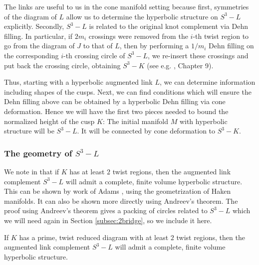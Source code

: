 The links are useful to us in the cone manifold setting because
first, symmetries of the diagram of $L$ allow us to determine the
hyperbolic structure on $S^3-L$ explicitly.  Secondly, $S^3-L$ is
related to the original knot complement via Dehn filling.  In
particular, if $2m_i$ crossings were removed from the $i$-th twist
region to go from the diagram of $J$ to that of $L$, then by
performing a $1/m_i$ Dehn filling on the corresponding $i$-th crossing
circle of $S^3-L$, we re-insert these crossings and put back the
crossing circle, obtaining $S^3-K$ (see e.g.  \cite{rolfsen-book},
Chapter 9).

Thus, starting with a hyperbolic augmented link $L$, we can determine
information including shapes of the cusps.  Next, we can find
conditions which will ensure the Dehn filling above can be obtained by
a hyperbolic Dehn filling via cone deformation.  Hence we will have
the first two pieces needed to bound the normalized height of the cusp
$K$: The initial manifold $M$ with hyperbolic structure will be
$S^3-L$.  It will be connected by cone deformation to $S^3-K$.

\subsubsection{The geometry of $S^3-L$}

We note in \cite{futer-purcell} that if $K$ has at least $2$ twist
regions, then the augmented link complement $S^3-L$ will admit a
complete, finite volume hyperbolic structure.  This can be shown by
work of Adams \cite{adams:aug}, using the geometrization of Haken
manifolds.  It can also be shown more directly using Andreev's
theorem.  The proof using Andreev's theorem gives a packing of circles
related to $S^3-L$ which we will need again in Section
\ref{subsec:2bridge}, so we include it here.

\begin{theorem}
  If $K$ has a prime, twist reduced diagram with at least $2$ twist
  regions, then the augmented link complement $S^3-L$ will admit a
  complete, finite volume hyperbolic structure.
\label{thm:Lhyp}
\end{theorem}

